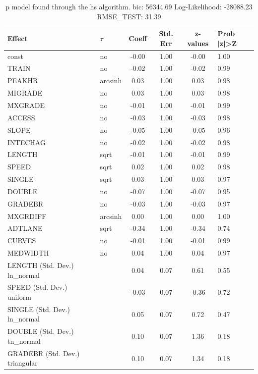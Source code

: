 \begin{table}
	\caption{p model found through the hs algorithm. bic: 56344.69 Log-Likelihood: -28088.23 RMSE_TEST: 31.39}
	\begin{center}
		\begin{tabular}{|l|l|c|c|c|l|}
			\hline
			Effect & $\tau$ & Coeff & Std. Err & z-values & Prob |z|>Z \\
			\hline
			const & no & -0.00 & 1.00 & -0.00 & 1.00 \\
			\hline
			TRAIN & no & -0.02 & 1.00 & -0.02 & 0.99 \\
			\hline
			PEAKHR & arcsinh & 0.03 & 1.00 & 0.03 & 0.98 \\
			\hline
			MIGRADE & no & 0.03 & 1.00 & 0.03 & 0.98 \\
			\hline
			MXGRADE & no & -0.01 & 1.00 & -0.01 & 0.99 \\
			\hline
			ACCESS & no & -0.03 & 1.00 & -0.03 & 0.98 \\
			\hline
			SLOPE & no & -0.05 & 1.00 & -0.05 & 0.96 \\
			\hline
			INTECHAG & no & -0.02 & 1.00 & -0.02 & 0.98 \\
			\hline
			LENGTH & sqrt & -0.01 & 1.00 & -0.01 & 0.99 \\
			\hline
			SPEED & sqrt & 0.02 & 1.00 & 0.02 & 0.98 \\
			\hline
			SINGLE & sqrt & 0.03 & 1.00 & 0.03 & 0.97 \\
			\hline
			DOUBLE & no & -0.07 & 1.00 & -0.07 & 0.95 \\
			\hline
			GRADEBR & no & -0.03 & 1.00 & -0.03 & 0.97 \\
			\hline
			MXGRDIFF & arcsinh & 0.00 & 1.00 & 0.00 & 1.00 \\
			\hline
			ADTLANE & sqrt & -0.34 & 1.00 & -0.34 & 0.74 \\
			\hline
			CURVES & no & -0.01 & 1.00 & -0.01 & 0.99 \\
			\hline
			MEDWIDTH & no & 0.04 & 1.00 & 0.04 & 0.97 \\
			\hline
			LENGTH (Std. Dev.) ln_normal &  & 0.04 & 0.07 & 0.61 & 0.55 \\
			\hline
			SPEED (Std. Dev.) uniform &  & -0.03 & 0.07 & -0.36 & 0.72 \\
			\hline
			SINGLE (Std. Dev.) ln_normal &  & 0.05 & 0.07 & 0.72 & 0.47 \\
			\hline
			DOUBLE (Std. Dev.) tn_normal &  & 0.10 & 0.07 & 1.36 & 0.18 \\
			\hline
			GRADEBR (Std. Dev.) triangular &  & 0.10 & 0.07 & 1.34 & 0.18 \\

\end{tabular}
\end{center}
\end{table}
